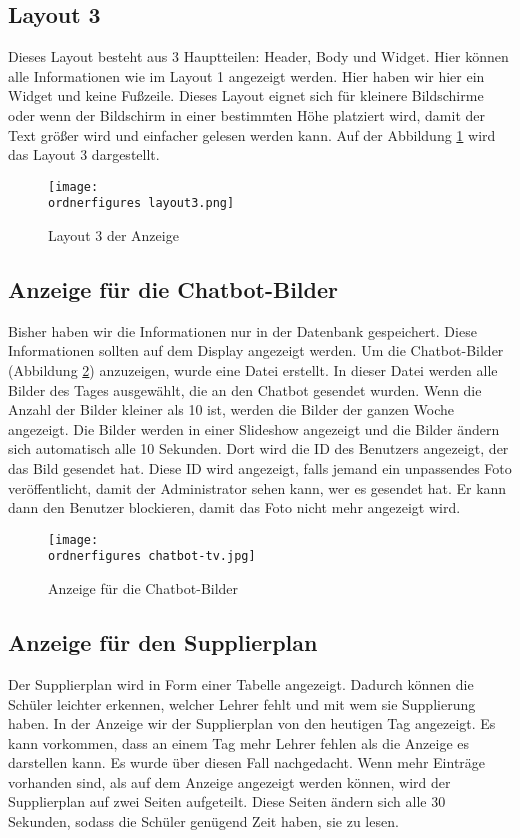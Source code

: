 \subsection{Layout 3}
Dieses Layout besteht aus 3 Hauptteilen: Header, Body und Widget. Hier können alle Informationen wie im Layout 1 angezeigt werden. Hier haben wir hier ein Widget und keine Fußzeile. Dieses Layout eignet sich für kleinere Bildschirme oder wenn der Bildschirm in einer bestimmten Höhe platziert wird, damit der Text größer wird und einfacher gelesen werden kann. Auf der Abbildung \ref{fi:layout3} wird das Layout 3 dargestellt.

\begin{figure}[H]
	\centering
	\texttt{[image: \\ordnerfigures layout3.png]}
	\caption{Layout 3 der Anzeige}
	\label{fi:layout3}
\end{figure}

\subsection{Anzeige für die Chatbot-Bilder}

Bisher haben wir die Informationen nur in der Datenbank gespeichert. Diese Informationen sollten auf dem Display angezeigt werden. Um die Chatbot-Bilder (Abbildung \ref{fi:chatbot}) anzuzeigen, wurde eine Datei erstellt. In dieser Datei werden alle Bilder des Tages ausgewählt, die an den Chatbot gesendet wurden. Wenn die Anzahl der Bilder kleiner als 10 ist, werden die Bilder der ganzen Woche angezeigt. Die Bilder werden in einer Slideshow angezeigt und die Bilder ändern sich automatisch alle 10 Sekunden.
Dort wird die ID des Benutzers angezeigt, der das Bild gesendet hat. Diese ID wird angezeigt, falls jemand ein unpassendes Foto veröffentlicht, damit der Administrator sehen kann, wer es gesendet hat. Er kann dann den Benutzer blockieren, damit das Foto nicht mehr angezeigt wird.

\begin{figure}[H]
	\centering
	\texttt{[image: \\ordnerfigures chatbot-tv.jpg]}
	\caption{Anzeige für die Chatbot-Bilder}
	\label{fi:chatbot}
\end{figure}

\subsection{Anzeige für den Supplierplan}

Der Supplierplan wird in Form einer Tabelle angezeigt. Dadurch können die Schüler leichter erkennen, welcher Lehrer fehlt und mit wem sie Supplierung haben. In der Anzeige wir der Supplierplan von den heutigen Tag angezeigt. Es kann vorkommen, dass an einem Tag mehr Lehrer fehlen als die Anzeige es darstellen kann. Es wurde über diesen Fall nachgedacht. Wenn mehr Einträge vorhanden sind, als auf dem Anzeige angezeigt werden  können, wird der Supplierplan auf zwei Seiten aufgeteilt. Diese Seiten ändern sich alle 30 Sekunden, sodass die Schüler genügend Zeit haben, sie zu lesen.

